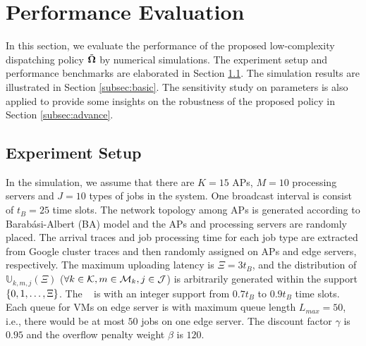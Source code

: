 \section{Performance Evaluation}
\label{sec:evaluation}
In this section, we evaluate the performance of the proposed low-complexity dispatching policy $\tilde{\boldsymbol{\Omega}}$ by numerical simulations.
The experiment setup and performance benchmarks are elaborated in Section \ref{subsec:setup}.
The simulation results are illustrated in Section \ref{subsec:basic}.
The sensitivity study on parameters is also applied to provide some insights on the robustness of the proposed policy in Section \ref{subsec:advance}.

\subsection{Experiment Setup}
\label{subsec:setup}
In the simulation, we assume that there are $K=15$ APs, $M=10$ processing servers and $J=10$ types of jobs in the system.
One broadcast interval is consist of $t_{B}=25$ time slots.
The network topology among APs is generated according to Barab\'asi-Albert (BA) model \cite{albert1999diameter} and the APs and processing servers are randomly placed.
The arrival traces and job processing time for each job type are extracted from Google cluster traces \cite{clusterdata:Reiss2011} and then randomly assigned on APs and edge servers, respectively.
The maximum uploading latency is $\Xi = 3t_B$, and the distribution of $\mathbb{U}_{k,m,j}(\Xi)$ ($\forall k\in\mathcal{K}, m\in\mathcal{M}_{k}, j\in\mathcal{J}$) is arbitrarily generated within the support $\{0, 1, \dots, \Xi\}$.
The \brlatency~ is with an integer support from $0.7t_B$ to $0.9t_B$ time slots.
Each queue for VMs on edge server is with maximum queue length $L_{max}=50$, i.e., there would be at most $50$ jobs on one edge server.
The discount factor $\gamma$ is $0.95$ and the overflow penalty weight $\beta$ is $120$.

